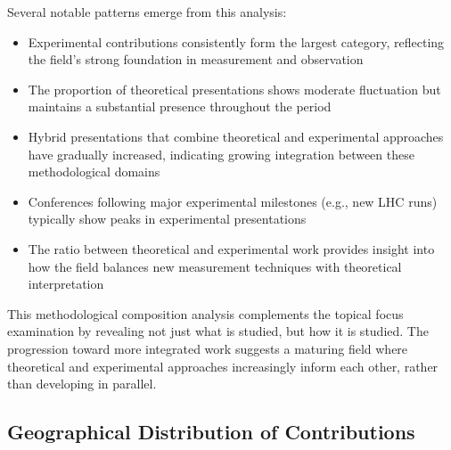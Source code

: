 \documentclass[a4paper,11pt]{article}
\begin{document}
Several notable patterns emerge from this analysis:

\begin{itemize}
    \item Experimental contributions consistently form the largest category, reflecting the field's strong foundation in measurement and observation
    \item The proportion of theoretical presentations shows moderate fluctuation but maintains a substantial presence throughout the period
    \item Hybrid presentations that combine theoretical and experimental approaches have gradually increased, indicating growing integration between these methodological domains
    \item Conferences following major experimental milestones (e.g., new LHC runs) typically show peaks in experimental presentations
    \item The ratio between theoretical and experimental work provides insight into how the field balances new measurement techniques with theoretical interpretation
\end{itemize}

This methodological composition analysis complements the topical focus examination by revealing not just what is studied, but how it is studied. The progression toward more integrated work suggests a maturing field where theoretical and experimental approaches increasingly inform each other, rather than developing in parallel.

\subsection{Geographical Distribution of Contributions}
\end{document}
